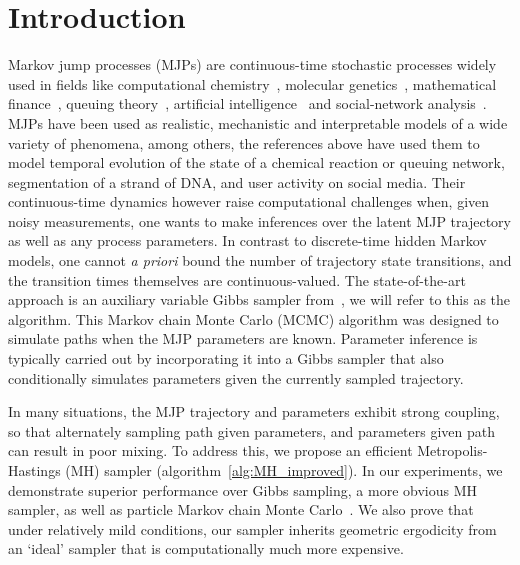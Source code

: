
\section{Introduction}
\label{sec:intro}
Markov jump processes (MJPs) are continuous-time stochastic processes widely used in fields like computational chemistry~\citep{gillespie97}, molecular genetics~\citep{FearnSher2006}, mathematical finance~\citep{Elliott06}, queuing theory~\citep{Breuer2003}, artificial intelligence~\citep{XuShe10} and social-network analysis~\citep{pan2016markov}. 
MJPs have been used as realistic, mechanistic and interpretable models of a wide variety of phenomena, among others, the references above have used them to model temporal evolution of the state of a chemical reaction or queuing network, segmentation of a strand of DNA, and user activity on social media.
Their continuous-time dynamics however raise computational challenges when, given noisy measurements, one wants to make inferences 
over the latent MJP trajectory as well as any process parameters. 
In contrast to {discrete-time} hidden Markov models, one cannot 
{\em a priori} bound the number of trajectory state transitions, and the transition times themselves are continuous-valued. 
The state-of-the-art approach is an auxiliary variable Gibbs sampler from~\cite{RaoTeh13}, we will refer to this as the {\algname} algorithm. 
This Markov chain Monte Carlo (MCMC) algorithm was designed to simulate paths when the MJP parameters are known. 
Parameter inference is typically carried out by incorporating it into a Gibbs sampler that also conditionally simulates parameters given the currently sampled trajectory. 

In many situations, the MJP trajectory and parameters exhibit strong coupling, so that alternately sampling path given parameters, and parameters given path can result in poor mixing.  
To address this, we propose an efficient Metropolis-Hastings (MH) sampler (algorithm~\ref{alg:MH_improved}). 
In our experiments, we demonstrate superior performance over Gibbs sampling, a more obvious MH sampler, as well as particle Markov chain Monte Carlo~\citep{Andrieu10}. 
We also prove that under relatively mild conditions, our sampler inherits geometric ergodicity from an `ideal' sampler that is computationally much more expensive.

